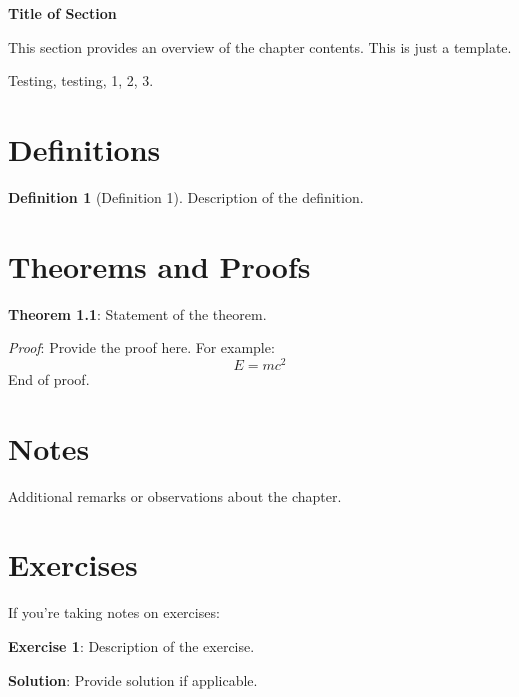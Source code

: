 \documentclass[12pt]{article}   %
\theoremstyle{definition}
\newtheorem{definition}{Definition}[section]
\theoremstyle{remark}
\begin{document}
\begin{center}
    \Large{\textbf{Title of Section}} \\
\end{center}

This section provides an overview of the chapter contents. This is just a template.

Testing, testing, 1, 2, 3.

\section{Definitions}
\begin{definition}[Definition 1]
	Description of the definition.
\end{definition}

\section{Theorems and Proofs}
\textbf{Theorem 1.1}: Statement of the theorem.

\textit{Proof}: Provide the proof here. For example:
\[
E = mc^2
\]
End of proof.

\section{Notes}
Additional remarks or observations about the chapter.

\section{Exercises}
If you're taking notes on exercises:

\medskip

\textbf{Exercise 1}: Description of the exercise.

\textbf{Solution}: Provide solution if applicable.

\end{document}

